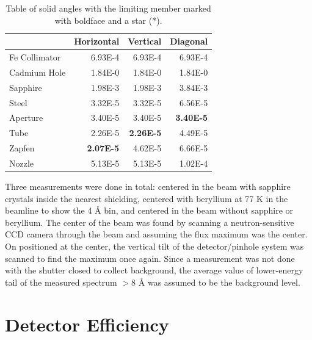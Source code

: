 \documentclass[5p,12pt]{elsarticle}
\begin{document}
\begin{table}
\scriptsize
\begin{center}
     \caption{Table of solid angles with the limiting member marked with boldface and a star (*).  \label{tab:sa} }
\begin{tabular}{|l|r|r|r|}
     \hline
                   &     Horizontal  &     Vertical   &     Diagonal   \\
     \hline
     Fe Collimator &     6.93E-4  &     6.93E-4 &     6.93E-4 \\
     \hline 
     Cadmium Hole  &     1.84E-0  &     1.84E-0 &     1.84E-0 \\
     \hline 
     Sapphire      &     1.98E-3  &     1.98E-3 &     3.84E-3 \\
     \hline 
     Steel         &     3.32E-5  &     3.32E-5 &     6.56E-5 \\
     \hline
     Aperture      &     3.40E-5  &     3.40E-5 &\bf* 3.40E-5 \\
     \hline
     Tube          &     2.26E-5  &\bf* 2.26E-5 &     4.49E-5  \\
     \hline
     Zapfen        &\bf* 2.07E-5  &     4.62E-5 &     6.66E-5 \\
     \hline
     Nozzle        &     5.13E-5  &     5.13E-5 &     1.02E-4 \\
     \hline
\end{tabular}
\end{center}
\end{table}

Three measurements were done in total: centered in the beam with sapphire crystals inside the nearest shielding, centered with beryllium at 77 K in the beamline to show the 4 {\AA} bin, and centered in the beam without sapphire or beryllium.  The center of the beam was found by scanning a neutron-sensitive CCD camera through the beam and assuming the flux maximum was the center.  On positioned at the center, the vertical tilt of the detector/pinhole system was scanned to find the maximum once again.  Since a measurement was not done with the shutter closed to collect background, the average value of lower-energy tail of the measured spectrum $>$8 {\AA} was assumed to be the background level.

%
%
%
%
%

%
%
%
%
%


\section{Detector Efficiency}
\label{sec:eff}
\end{document}
